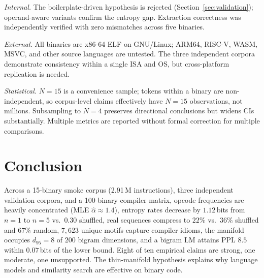 \documentclass[conference]{IEEEtran}
\begin{document}
\emph{Internal.}  The boilerplate-driven hypothesis is rejected
(Section~\ref{sec:validation}); operand-aware variants confirm the
entropy gap.  Extraction correctness was independently verified with
zero mismatches across five binaries.

\emph{External.}  All binaries are x86-64 ELF on GNU/Linux; ARM64,
RISC-V, WASM, MSVC, and other source languages are untested.  The three
independent corpora demonstrate consistency within a single ISA and OS,
but cross-platform replication is needed.

\emph{Statistical.}  $N{=}15$ is a convenience sample; tokens within a
binary are non-independent, so corpus-level claims effectively have
$N{=}15$ observations, not millions.  Subsampling to $N{=}4$ preserves
directional conclusions but widens CIs substantially.  Multiple metrics
are reported without formal correction for multiple comparisons.

\section{Conclusion}
\label{sec:conclusion}

Across a 15-binary smoke corpus (2.91\,M instructions), three
independent validation corpora, and a 100-binary compiler matrix,
opcode frequencies are heavily concentrated
(MLE $\hat{\alpha}{\approx}1.4$), entropy rates decrease by
$1.12$\,bits from $n{=}1$ to $n{=}5$ vs.\ $0.30$ shuffled, real
sequences compress to $22\%$ vs.\ $36\%$ shuffled and $67\%$ random,
$7{,}623$ unique motifs capture compiler idioms, the manifold
occupies $d_{95}{=}8$ of $200$ bigram dimensions, and a bigram LM
attains PPL $8.5$ within $0.07$\,bits of the lower bound.
Eight of ten empirical claims are strong, one moderate, one
unsupported.  The thin-manifold hypothesis explains why language
models and similarity search are effective on binary code.
\end{document}
